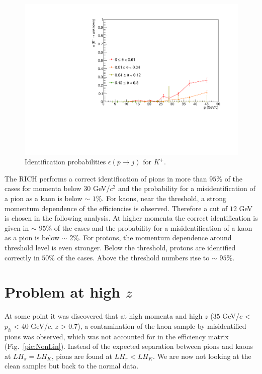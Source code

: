 \begin{figure}[!p]
  \includegraphics[scale=0.35]{./gfx/Kp_u.pdf}
	\caption{Identification probabilities $\epsilon(p \rightarrow j)$ for $K^+$.}
	\label{pic:Effkp}
\end{figure}

The RICH performs a correct identification of pions in more than $95$\% of the cases for momenta below 30 GeV/$c^2$ and the probability for a misidentification of a pion as a kaon is below $\sim$ $1$\%. For kaons, near the threshold, a strong momentum dependence of the efficiencies is observed. Therefore a cut of $12$ GeV is chosen in the following analysis. At higher momenta the correct identification is given in $\sim$ $95$\% of the cases and the probability for a misidentification of a kaon as a pion is below $\sim$ $2$\%. For protons, the momentum dependence around threshold level is even stronger. Below the threshold, protons are identified correctly in $50$\% of the cases. Above the threshold numbers rise to $\sim$ $95$\%.

\section{Problem at high $z$}

At some point it was discovered that at high momenta and high $z$ ($35$ GeV/$c$ < $p_h$ < $40$ GeV/$c$, $z$ > $0.7$), a contamination of the kaon sample by misidentified pions was observed, which was not accounted for in the efficiency matrix (Fig.~\ref{pic:NonLin}). Instead of the expected separation between pions and kaons at $LH_{\pi} = LH_K$, pions are found at $LH_{\pi} < LH_K$. We are now not looking at the clean samples but back to the normal data.

